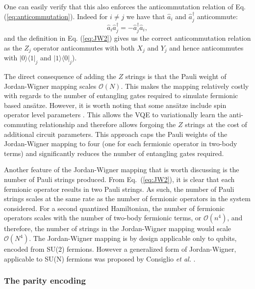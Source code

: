 One can easily verify that this also enforces the anticommutation relation of Eq. (\ref{eq:anticommutation}). Indeed for $i \neq j$ we have that $\hat{a}_i$ and $\hat{a}_j^\dagger$ anticommute:
\begin{equation}
\hat{a}_i \hat{a}_j^{\dagger} = -\hat{a}_j^{\dagger} \hat{a}_i,
\end{equation}
and the definition in Eq. (\ref{eq:JW2}) gives us the correct anticommutation relation as the $Z_j$ operator anticommutes with both $X_j$ and $Y_j$ and hence anticommutes with $|0\rangle \langle 1|_j$ and $|1\rangle \langle 0|_j$).

The direct consequence of adding the $Z$ strings is that the Pauli weight of Jordan-Wigner mapping scales $\mathcal{O}(N)$. This makes the mapping relatively costly with regards to the number of entangling gates required to simulate fermionic based ans{\"{a}}tze. However, it is worth noting that some ans{\"{a}}tze include spin operator level parameters \cite{Yordanov2021}. This allows the VQE to variationally learn the anti-commuting relationship and therefore allows forgoing the $Z$ strings at the cost of additional circuit parameters. This approach caps the Pauli weights of the Jordan-Wigner mapping to four (one for each fermionic operator in two-body terms) and significantly reduces the number of entangling gates required.  

Another feature of the Jordan-Wigner mapping that is worth discussing is the number of Pauli strings produced. From Eq.~(\ref{eq:JW2}), it is clear that each fermionic operator results in two Pauli strings. As such, the number of Pauli strings scales at the same rate as the number of fermionic operators in the system considered. For a second quantized Hamiltonian, the number of fermionic operators scales with the number of two-body fermionic terms, or $\mathcal{O}(n^4)$, and therefore, the number of strings in the Jordan-Wigner mapping would scale  $\mathcal{O}(N^4)$. The Jordan-Wigner mapping is by design applicable only to qubits, encoded from SU(2) fermions. However a generalized form of Jordan-Wigner, applicable to SU(N) fermions was proposed by Consiglio \textit{et al.} \cite{Consiglio2021}.

\subsubsection{The parity encoding}

